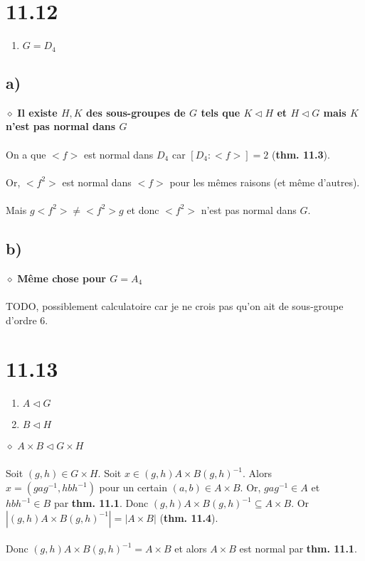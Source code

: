 \documentclass[a4paper,10pt]{article}
\begin{document}
\section*{11.12}
\begin{enumerate}
	\item $G = D_4$
\end{enumerate}
\subsection*{a)}
$\diamond$ \textbf{Il existe $H,K$ des sous-groupes de $G$ tels que $K \triangleleft H$ et $H \triangleleft G$ mais $K$ n'est pas normal dans $G$}
\\
\\
On a que $<f>$ est normal dans $D_4$ car $[D_4 : <f>] = 2$ (\textbf{thm. 11.3}).
\\
\\
Or, $<f^2>$ est normal dans $<f>$ pour les mêmes raisons (et même d'autres).
\\
\\
Mais $g<f^2> \not = <f^2>g$ et donc $<f^2>$ n'est pas normal dans $G$.

\subsection*{b)}
$\diamond$ \textbf{Même chose pour $G = A_4$}
\\
\\
TODO, possiblement calculatoire car je ne crois pas qu'on ait de sous-groupe d'ordre 6.

\section*{11.13}
\begin{enumerate}
	\item $A \triangleleft G$
	\item $B \triangleleft H$
\end{enumerate}
$\diamond$ \textbf{$A \times B \triangleleft G \times H$}
\\
\\
Soit $(g,h) \in G \times H$. Soit $x \in (g,h) A \times B (g,h)^{-1}$. Alors $x = (gag^{-1}, hbh^{-1})$ pour un certain $(a,b) \in A \times B$. Or, $gag^{-1} \in A$ et $hbh^{-1} \in B$ par \textbf{thm. 11.1}. Donc $(g,h) A \times B (g,h)^{-1} \subseteq A \times B$. Or $|(g,h) A \times B (g,h)^{-1}| = |A \times B|$ (\textbf{thm. 11.4}).
\\
\\
Donc $(g,h) A \times B (g,h)^{-1} = A \times B$ et alors $A \times B$ est normal par \textbf{thm. 11.1}.
\end{document}
